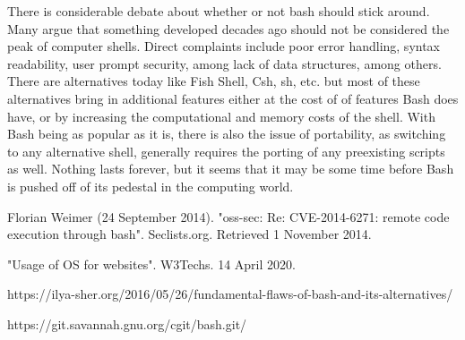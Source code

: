 \documentclass[prb,preprint]{revtex4-1}
\begin{document}
There is considerable debate about whether or not bash should stick around. Many argue that something developed decades ago should not be considered the peak of computer shells. Direct complaints include poor error handling, syntax readability, user prompt security, among lack of data structures, among others. There are alternatives today like Fish Shell, Csh, sh, etc. but most of these alternatives bring in additional features either at the cost of of features Bash does have, or by increasing the computational and memory costs of the shell. With Bash being as popular as it is, there is also the issue of portability, as switching to any alternative shell, generally requires the porting of any preexisting scripts as well. Nothing lasts forever, but it seems that it may be some time before Bash is pushed off of its pedestal in the computing world.

\begin{thebibliography}{99}
\bibitem{}Florian Weimer (24 September 2014). "oss-sec: Re: CVE-2014-6271: remote code execution through bash". Seclists.org. Retrieved 1 November 2014.

\bibitem{}"Usage of OS for websites". W3Techs. 14 April 2020.

\bibitem{}https://ilya-sher.org/2016/05/26/fundamental-flaws-of-bash-and-its-alternatives/

\bibitem{}https://git.savannah.gnu.org/cgit/bash.git/
\end{thebibliography}
\end{document}
